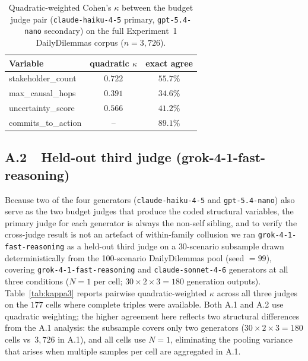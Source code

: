 \documentclass[11pt]{article}
\begin{document}
\begin{table}[t]
\centering
\small
\begin{tabular}{lcc}
\toprule
Variable & quadratic $\kappa$ & exact agree \\
\midrule
stakeholder\_count  & $0.722$ & $55.7\%$ \\
max\_causal\_hops   & $0.391$ & $34.6\%$ \\
uncertainty\_score  & $0.566$ & $41.2\%$ \\
commits\_to\_action & --      & $89.1\%$ \\
\bottomrule
\end{tabular}
\caption{Quadratic-weighted Cohen's $\kappa$ between the budget judge pair
(\texttt{claude-haiku-4-5} primary, \texttt{gpt-5.4-nano} secondary) on
the full Experiment~1 DailyDilemmas corpus ($n = 3{,}726$).}
\label{tab:kappa}
\end{table}

\subsection*{A.2~~Held-out third judge (grok-4-1-fast-reasoning)}

Because two of the four generators (\texttt{claude-haiku-4-5} and
\texttt{gpt-5.4-nano}) also serve as the two budget judges that produce
the coded structural variables, the primary judge for each generator
is always the non-self sibling, and to verify the cross-judge result
is not an artefact of within-family collusion we ran
\texttt{grok-4-1-fast-reasoning} as a held-out third judge on a
$30$-scenario subsample drawn deterministically from the 100-scenario
DailyDilemmas pool (seed $= 99$), covering
\texttt{grok-4-1-fast-reasoning} and \texttt{claude-sonnet-4-6}
generators at all three conditions ($N{=}1$ per cell;
$30 \times 2 \times 3 = 180$ generation outputs). Table~\ref{tab:kappa3}
reports pairwise quadratic-weighted $\kappa$ across all three judges on
the $177$ cells where complete triples were available.
Both A.1 and A.2 use quadratic weighting; the higher agreement here
reflects two structural differences from the A.1 analysis: the subsample
covers only two generators ($30 \times 2 \times 3 = 180$ cells vs\
$3{,}726$ in A.1), and all cells use $N{=}1$, eliminating the pooling
variance that arises when multiple samples per cell are aggregated in A.1.
\end{document}
